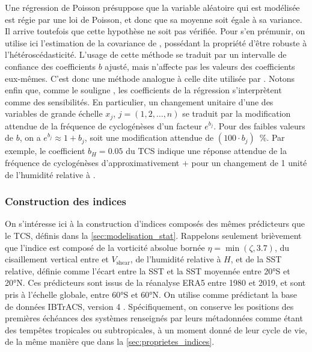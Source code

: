 \documentclass[../main.tex]{subfiles}
\begin{document}
Une régression de Poisson présuppose que la variable aléatoire qui est modélisée est régie par une loi de Poisson, et donc que sa moyenne soit égale à sa
variance. Il arrive toutefois que cette hypothèse ne soit pas vérifiée. Pour s'en prémunir, on utilise ici l'estimation de la covariance de
\textcite{mackinnon_heteroskedasticityconsistent_1985}, possédant la propriété d'être robuste à l'hétéroscédasticité. L'usage de cette méthode se traduit par un
intervalle de confiance des coefficients $b$ ajusté, mais n'affecte pas les valeurs des coefficients eux-mêmes. C'est donc une méthode analogue à celle dite
 utilisée par \textcite{tippett_poisson_2011}. Notons enfin que, comme le souligne \textcite{tippett_poisson_2011}, les coefficients de
la régression s'interprètent comme des sensibilités. En particulier, un changement unitaire d'une des variables de grande échelle $x_j$, $j = (1, 2, \ldots, n)$
se traduit par la modification attendue de la fréquence de cyclogénèses d'un facteur $e^{b_j}$. Pour des faibles valeurs de $b$, on a $e^{b_j} \approx 1 + b_j$,
soit une modification attendue de $(100 \cdot b_j)$~\%. Par exemple, le coefficient $b_H = \num{0.05}$ du TCS indique une réponse attendue de la fréquence de
cyclogénèses d'approximativement $+$ pour un changement de 1 unité de l'humidité relative à .

\subsubsection*{Construction des indices}

On s'intéresse ici à la construction d'indices composés des mêmes prédicteurs que le TCS, définis dans la \cref{sec:modelisation_stat}. Rappelons seulement
brièvement que l'indice est composé de la vorticité absolue bornée $\eta = \min(\zeta, \num{3.7})$, du cisaillement vertical entre  et 
$V_{\mathrm{shear}}$, de l'humidité relative à  $H$, et de la SST relative, définie comme l'écart entre la SST et la SST moyennée entre \ang{20}S et
\ang{20}N. Ces prédicteurs sont issus de la réanalyse ERA5 entre \num{1980} et \num{2019}, et sont pris à l'échelle globale, entre \ang{60}S et \ang{60}N. On
utilise comme prédictant la base de données IBTrACS, version 4 \parencite{knapp_international_2010}. Spécifiquement, on conserve les positions des premières
échéances des systèmes renseignés par leurs métadonnées comme étant des tempêtes tropicales ou subtropicales, à un moment donné de leur cycle de vie, de la même
manière que dans la \cref{sec:proprietes_indices}.
\end{document}
